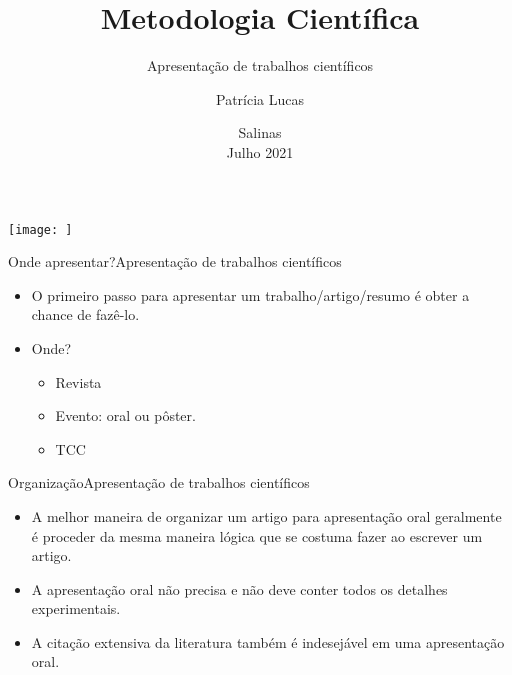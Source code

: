 \documentclass[t]{beamer}
\title[]{Metodologia Científica}
\subtitle[]{Apresentação de trabalhos científicos}
\author[]{Patrícia Lucas\\{\footnotesize }}
\institute{Bacharelado em Sistemas de Informação \\ IFNMG  - Campus Salinas}
\date{\scriptsize Salinas\\Julho 2021}
\begin{document}
\begin{frame}

\begin{center}
\texttt{[image: ]}
\end{center}
  \titlepage
\end{frame}



\begin{ftst}{Onde apresentar?}{Apresentação de trabalhos científicos}
\begin{itemize}
    \item O primeiro passo para apresentar um trabalho/artigo/resumo é obter a chance de fazê-lo.
    \vone
    \item Onde?
    \begin{itemize}
        \item Revista
        \item Evento: oral ou pôster.
        \item TCC
    \end{itemize}
\end{itemize}
\end{ftst}


\begin{ftst}{Organização}{Apresentação de trabalhos científicos}
\begin{itemize}
    \item A melhor maneira de organizar um artigo para apresentação oral geralmente é proceder da mesma maneira lógica que se costuma fazer ao escrever um artigo.
    \item A apresentação oral não precisa e não deve conter todos os detalhes experimentais.
    \item A citação extensiva da literatura também é indesejável em uma apresentação oral.
\end{itemize}
\end{ftst}
\end{document}
